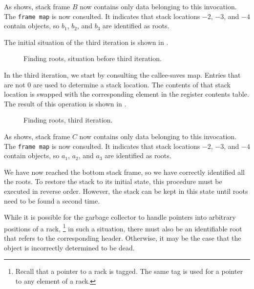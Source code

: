 As  shows, stack frame $B$ now
contains only data belonging to this invocation.  The \texttt{frame
  map} is now consulted.  It indicates that stack locations $-2$,
$-3$, and $-4$ contain \commonlisp{} objects, so $b_1$, $b_2$, and
$b_3$ are identified as roots.

The initial situation of the third iteration is shown in
.

\begin{figure}
\begin{center}
\end{center}
\caption{\label{fig-root-finding-example-3}
Finding roots, situation before third iteration.}
\end{figure}

In the third iteration, we start by consulting the callee-saves map.
Entries that are not $0$ are used to determine a stack location.  The
contents of that stack location is swapped with the corresponding
element in the register contents table.  The result of this operation
is shown in .

\begin{figure}
\begin{center}
\end{center}
\caption{\label{fig-root-finding-example-3b}
Finding roots, third iteration.}
\end{figure}

As  shows, stack frame $C$ now
contains only data belonging to this invocation.  The \texttt{frame
  map} is now consulted.  It indicates that stack locations $-2$,
$-3$, and $-4$ contain \commonlisp{} objects, so $a_1$, $a_2$, and
$a_3$ are identified as roots.

We have now reached the bottom stack frame, so we have correctly
identified all the roots.  To restore the stack to its initial state,
this procedure must be executed in reverse order.  However, the stack
can be kept in this state until roots need to be found a second time.

While it is possible for the garbage collector to handle pointers into
arbitrary positions of a rack,%
\footnote{Recall that a pointer to a rack is tagged.  The same tag is
  used for a pointer to any element of a rack.}
in such a situation, there must also be an identifiable root that
refers to the corresponding header.  Otherwise, it may be the case
that the object is incorrectly determined to be dead.

